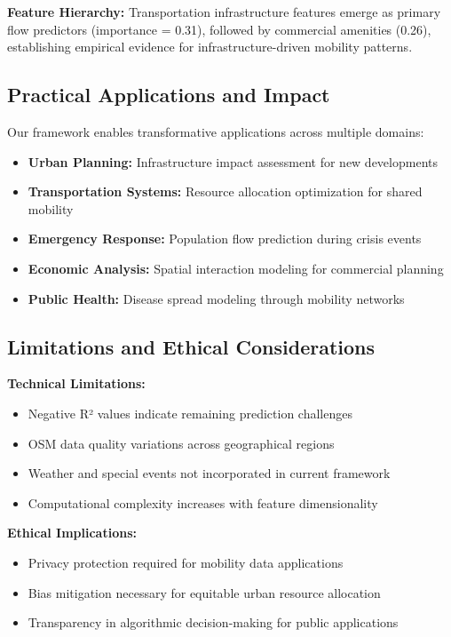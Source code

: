 \documentclass[twocolumn,11pt]{IEEEtran}  %
\begin{document}
\textbf{Feature Hierarchy:} Transportation infrastructure features emerge as primary flow predictors (importance = 0.31), followed by commercial amenities (0.26), establishing empirical evidence for infrastructure-driven mobility patterns.

\subsection{Practical Applications and Impact}

Our framework enables transformative applications across multiple domains:

\begin{itemize}
\item \textbf{Urban Planning:} Infrastructure impact assessment for new developments
\item \textbf{Transportation Systems:} Resource allocation optimization for shared mobility
\item \textbf{Emergency Response:} Population flow prediction during crisis events
\item \textbf{Economic Analysis:} Spatial interaction modeling for commercial planning
\item \textbf{Public Health:} Disease spread modeling through mobility networks
\end{itemize}

\subsection{Limitations and Ethical Considerations}

\textbf{Technical Limitations:}
\begin{itemize}
\item Negative R² values indicate remaining prediction challenges
\item OSM data quality variations across geographical regions
\item Weather and special events not incorporated in current framework
\item Computational complexity increases with feature dimensionality
\end{itemize}

\textbf{Ethical Implications:}
\begin{itemize}
\item Privacy protection required for mobility data applications
\item Bias mitigation necessary for equitable urban resource allocation
\item Transparency in algorithmic decision-making for public applications
\end{itemize}
\end{document}

